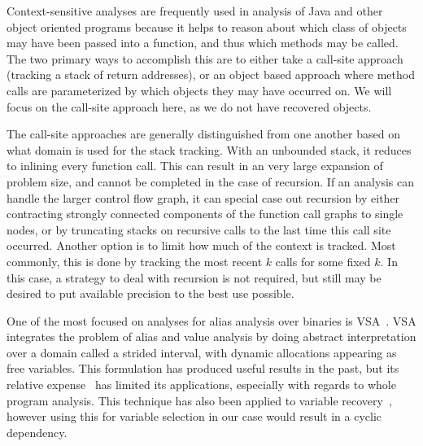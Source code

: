 Context-sensitive analyses are frequently used in analysis of Java and other object oriented programs because it helps to reason about which class of objects may have been passed into a function, and thus which methods may be called.
The two primary ways to accomplish this are to either take a call-site approach (tracking a stack of return addresses), or an object based approach where method calls are parameterized by which objects they may have occurred on.
We will focus on the call-site approach here, as we do not have recovered objects.

The call-site approaches are generally distinguished from one another based on what domain is used for the stack tracking.
With an unbounded stack, it reduces to inlining every function call.
This can result in an very large expansion of problem size, and cannot be completed in the case of recursion.
If an analysis can handle the larger control flow graph, it can special case out recursion by either contracting strongly connected components of the function call graphs to single nodes, or by truncating stacks on recursive calls to the last time this call site occurred.
Another option is to limit how much of the context is tracked.
Most commonly, this is done by tracking the most recent $k$ calls for some fixed $k$.
In this case, a strategy to deal with recursion is not required, but still may be desired to put available precision to the best use possible.

One of the most focused on analyses for alias analysis over binaries is VSA~\cite{vsa}.
VSA integrates the problem of alias and value analysis by doing abstract interpretation over a domain called a strided interval, with dynamic allocations appearing as free variables.
This formulation has produced useful results in the past, but its relative expense~\cite{angr-sok} has limited its applications, especially with regards to whole program analysis.
This technique has also been applied to variable recovery~\cite{divine}, however using this for variable selection in our case would result in a cyclic dependency.
